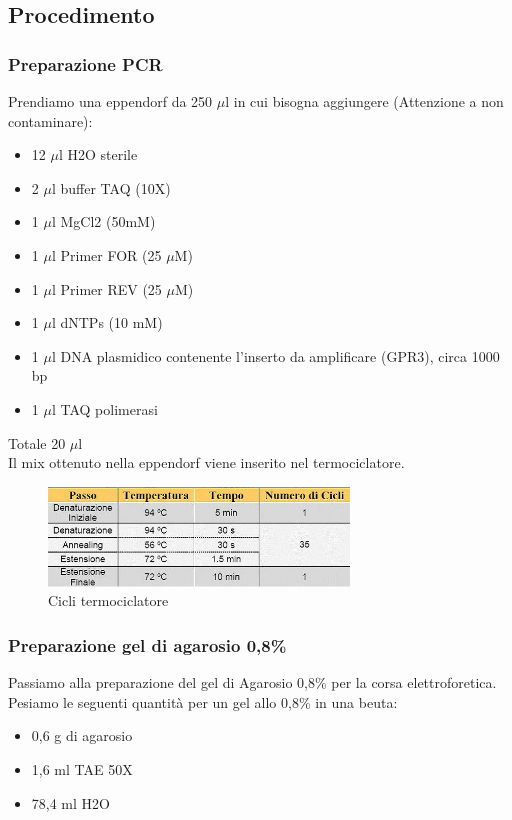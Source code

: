 \subsection{Procedimento}

\subsubsection{Preparazione PCR}

Prendiamo una eppendorf da 250 $\mu$l in cui bisogna aggiungere (Attenzione a non contaminare):
\begin{itemize}
	\item 12 $\mu$l H2O sterile
	\item 2 $\mu$l buffer TAQ (10X)
	\item 1 $\mu$l MgCl2 (50mM)
	\item 1 $\mu$l Primer FOR (25 $\mu$M)
	\item 1 $\mu$l Primer REV (25 $\mu$M)
	\item 1 $\mu$l dNTPs (10 mM)
	\item 1 $\mu$l DNA plasmidico contenente l’inserto da amplificare (GPR3), circa 1000 bp
	\item 1 $\mu$l TAQ polimerasi
\end{itemize}

Totale 20 $\mu$l\\

Il mix ottenuto nella eppendorf
viene inserito nel termociclatore.
\begin{figure}[htbp]
	\centering
	\includegraphics[width=80mm]{./immagini/cicli_termociclatore.jpg}
	\caption{Cicli termociclatore}
	\label{cicli_termociclatore}
\end{figure}

\subsubsection{Preparazione gel di agarosio 0,8\%}

Passiamo alla preparazione del gel di Agarosio 0,8\% per la corsa elettroforetica.
Pesiamo le seguenti quantità per un gel allo 0,8\% in una beuta:

\begin{itemize}
	\item 0,6 g  di agarosio
	\item 1,6  ml TAE 50X
	\item 78,4 ml H2O
\end{itemize}

